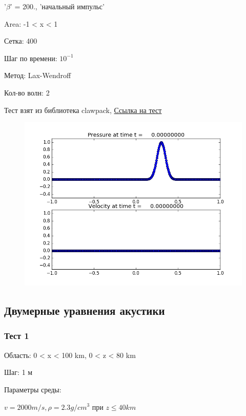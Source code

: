 \documentclass{article}
\begin{document}
             '$\beta$' = 200.,  'начальный импульс'
             
 Area: -1 < x < 1
 
Сетка: 400
 
Шаг по времени: $10^{-1}$
 
Метод: Lax-Wendroff
 
Кол-во волн: 2
 
  Тест взят из библиотека clawpack, \cite{clawpack}
  \href{http://www.clawpack.org/gallery/_static/classic/examples/acoustics_1d_example1/README.html}{Ссылка на тест}
 
 \begin{figure}[h]
  \begin{center}
    \includegraphics[scale=0.5]{1D_acoustic_test/TEST4/frame0000fig1.png}
  \end{center}
\end{figure}
 
\newpage
\subsection{Двумерные уравнения акустики}

\subsubsection{Тест 1} 

Область: 0 < x < 100 km, 0 < z < 80 km

Шаг: 1 м

Параметры среды: 

$v = 2000 m/s, \rho = 2.3 g/cm^3$ при $z \leq 40 km$
\end{document}
